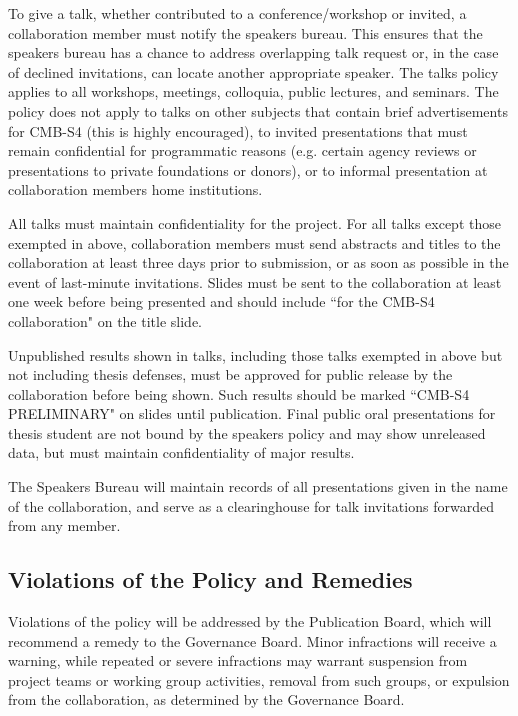 To give a talk, whether contributed to a conference/workshop or invited,  a collaboration member must notify the speakers bureau. This ensures that the speakers bureau has a chance to address overlapping talk request or, in the case of declined invitations, can locate another appropriate speaker.  The talks policy applies to all workshops, meetings, colloquia, public lectures, and seminars.  The policy does not apply to talks on other subjects that contain brief advertisements for CMB-S4 (this is highly encouraged), to invited presentations that must remain confidential for programmatic reasons (e.g. certain agency reviews or presentations to private foundations or donors), or to informal presentation at collaboration members home institutions.  

All talks must maintain confidentiality for the project. For all talks except those exempted in above, collaboration members must send abstracts and titles to the collaboration at least three days prior to submission, or as soon as possible in the event of last-minute invitations. Slides must be sent to the collaboration at least one week before being presented and should include ``for the CMB-S4 collaboration" on the title slide.

Unpublished results shown in talks, including those talks exempted in above but not including thesis defenses, must be approved for public release by the collaboration before being shown. Such results should be marked ``CMB-S4 PRELIMINARY" on slides until publication.  Final public oral presentations for thesis student are not bound by the speakers policy and may show unreleased data, but must maintain confidentiality of major results.

The Speakers Bureau will maintain records of all presentations given in the name of the collaboration, and serve as a clearinghouse for talk invitations forwarded from any member.  

\subsection{Violations of the Policy and Remedies}
Violations of the policy will be addressed by the Publication Board, which will recommend a remedy to the Governance Board.  Minor infractions will receive a warning, while repeated or severe infractions may warrant suspension from project teams or working group activities, removal from such groups, or expulsion from the collaboration, as determined by the Governance Board.

